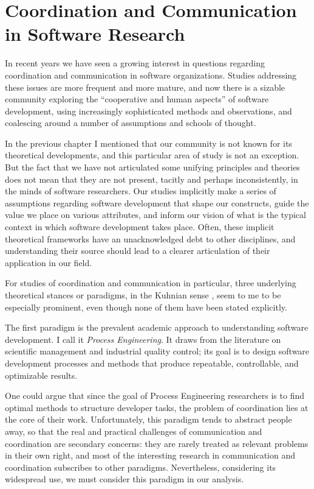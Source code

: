 \chapter{Coordination and Communication in Software Research}
\label{chap:related-sw}

In recent years we have seen a growing interest in questions regarding coordination and communication in software organizations. Studies addressing these issues are more frequent and more mature, and now there is a sizable community exploring the ``cooperative and human aspects'' of software development, using increasingly sophisticated methods and observations, and coalescing around a number of assumptions and schools of thought.

In the previous chapter I mentioned that our community is not known for its theoretical developments, and this particular area of study is not an exception. But the fact that we have not articulated some unifying principles and theories does not mean that they are not present, tacitly and perhaps inconsistently, in the minds of software researchers. Our studies implicitly make a series of assumptions regarding software development that shape our constructs, guide the value we place on various attributes, and inform our vision of what is the typical context in which software development takes place. Often, these implicit theoretical frameworks have an unacknowledged debt to other disciplines, and understanding their source should lead to a clearer articulation of their application in our field.

For studies of coordination and communication in particular, three underlying theoretical stances or paradigms, in the Kuhnian sense \cite{Kuhn1962}, seem to me to be especially prominent, even though none of them have been stated explicitly.

The first paradigm is the prevalent academic approach to understanding software development. I call it \emph{Process Engineering}. It draws from the literature on scientific management and industrial quality control; its goal is to design software development processes and methods that produce repeatable, controllable, and optimizable results.

One could argue that since the goal of Process Engineering researchers is to find optimal methods to structure developer tasks, the problem of coordination lies at the core of their work. Unfortunately, this paradigm tends to abstract people away, so that the real and practical challenges of communication and coordination are secondary concerns: they are rarely treated as relevant problems in their own right, and most of the interesting research in communication and coordination subscribes to other paradigms. Nevertheless, considering its widespread use, we must consider this paradigm in our analysis.


